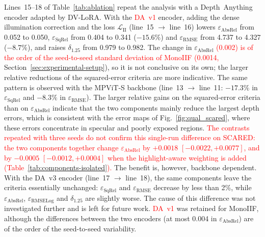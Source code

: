 \documentclass[a4paper,fleqn]{cas-dc}
\begin{document}
{{Lines~15--18 of Table~\ref{tab:ablation} repeat the analysis with a Depth~Anything encoder adapted by DV-LoRA. With the \textcolor{red}{DA~v1} encoder, adding the dense illumination correction and the loss $\mathcal{L}_\textrm{II}$ (line~15 $\rightarrow$ line~16) lowers $\varepsilon_\textrm{AbsRel}$ from 0.052 to 0.050, $\varepsilon_\textrm{SqRel}$ from 0.404 to 0.341 ($-15.6\%$) and $\varepsilon_\textrm{RMSE}$ from 4.737 to 4.327 ($-8.7\%$), and raises $\delta_{1.25}$ from 0.979 to 0.982. The change in $\varepsilon_\textrm{AbsRel}$ \textcolor{red}{(0.002) is of the order of the seed-to-seed standard deviation of MonoIIF (0.0014,} Section~\ref{sec:experimental-setup}), so it is not conclusive on its own; the larger relative reductions of the squared-error criteria are more indicative. The same pattern is observed with the MPViT-S backbone (line~13 $\rightarrow$ line~11: $-17.3\%$ in $\varepsilon_\textrm{SqRel}$ and $-8.3\%$ in $\varepsilon_\textrm{RMSE}$). The larger relative gains on the squared-error criteria than on $\varepsilon_\textrm{AbsRel}$ indicate that the two components mainly reduce the largest depth errors, which is consistent with the error maps of Fig.~\ref{fig:qual_scared}, where these errors concentrate in specular and poorly exposed regions. \textcolor{red}{The contrasts repeated with three seeds do not confirm this single-run difference on SCARED: the two components together change $\varepsilon_\textrm{AbsRel}$ by $+0.0018$ $[-0.0022, +0.0077]$, and by $-0.0005$ $[-0.0012, +0.0004]$ when the highlight-aware weighting is added (Table~\ref{tab:components-isolated}).}
The benefit is, however, backbone dependent. With the DA~v3 encoder (line~17 $\rightarrow$ line~18), the same components leave the criteria essentially unchanged: $\varepsilon_\textrm{SqRel}$ and $\varepsilon_\textrm{RMSE}$ decrease by less than 2\%, while $\varepsilon_\textrm{AbsRel}$, $\varepsilon_\textrm{RMSELog}$ and $\delta_{1.25}$ are slightly worse. The cause of this difference was not investigated further and is left for future work. \textcolor{red}{DA~v1} was retained for MonoIIF, although the differences between the two encoders (at most 0.004 in $\varepsilon_\textrm{AbsRel}$) are of the order of the seed-to-seed variability.}

}
\end{document}
